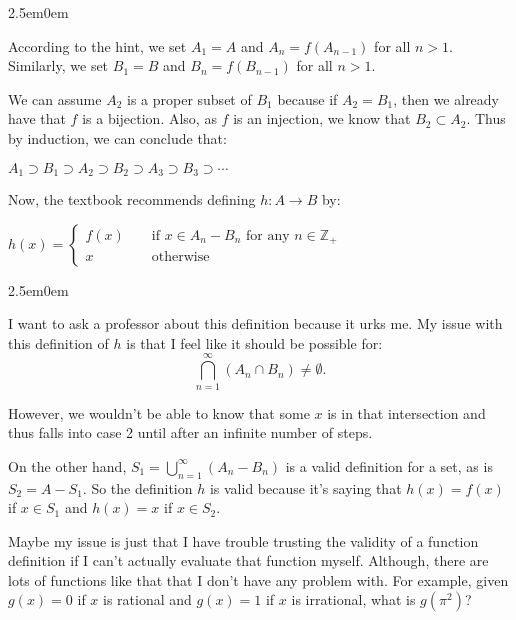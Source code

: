 \documentclass{book}
\newcommand{\myComment}{%
   \color{RawerSienna}%
   \fontsize{12}{14}\selectfont%
}
\newcommand{\exTwo}{%
\color{Purple}%
   \fontsize{13}{15}\selectfont%
}
\newenvironment{myIndent}{%
   \begin{adjustwidth}{2.5em}{0em}%
}{%
   \end{adjustwidth}%
}
\newcommand{\retTwo}{\hfill\bigbreak}
\begin{document}
   \begin{myIndent}\exTwo
      According to the hint, we set $A_1 = A$ and $A_n = f(A_{n-1})$ for all $n > 1$. Similarly, we set $B_1 = B$ and $B_n = f(B_{n-1})$ for all $n > 1$.\retTwo

      We can assume $A_2$ is a proper subset of $B_1$ because if $A_2 = B_1$, then we already have that $f$ is a bijection. Also, as $f$ is an injection, we know that $B_2 \subset A_2$. Thus by induction, we can conclude that:

      {\centering $ A_1 \supset B_1 \supset A_2 \supset B_2 \supset A_3 \supset B_3 \supset \cdots $\retTwo\par}

      Now, the textbook recommends defining $h: A \longrightarrow B$ by:

      \begin{center}
         $h(x) = \left\{
         \begin{matrix}
            f(x) & & \text{ if } x \in A_n - B_n \text{ for any } n \in \mathbb{Z}_+ \\
            x & & \text{ otherwise }
         \end{matrix}\right.$\newpage
      \end{center}

      
      \begin{myIndent}
         \myComment I want to ask a professor about this definition because it urks me. My issue with\\ this definition of $h$ is that I feel like it should be possible for:
         $$\bigcap\limits_{n=1}^\infty (A_n \cap B_n) \neq \emptyset.$$
         
         However, we wouldn't be able to know that some $x$ is in that intersection and\\ thus falls into case 2 until after an infinite number of steps.\retTwo
         
         On the other hand, $S_1 = \bigcup\limits_{n = 1}^\infty (A_n - B_n)$ is a valid definition for a set, as is\\ $S_2 = A - S_1$. So the definition $h$ is valid because it's saying that $h(x) = f(x)$\\ [6pt] if $x \in S_1$ and $h(x) = x$ if $x \in S_2$.\retTwo

         Maybe my issue is just that I have trouble trusting the validity of a function definition if I can't actually evaluate that function myself. Although, there are lots of functions like that that I don't have any problem with. For example, given $g(x) = 0$ if $x$ is rational and $g(x) = 1$ if $x$ is irrational, what is $g(\pi^2)$?\retTwo
      \end{myIndent}


\end{myIndent}
\end{document}
